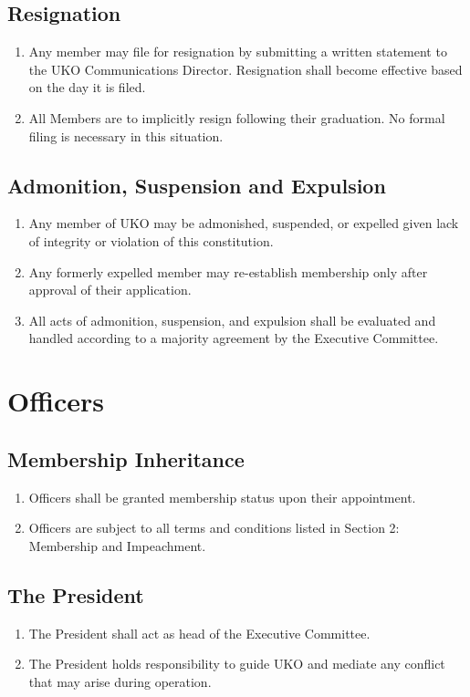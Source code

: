 \documentclass[12pt,executivepaper]{article}
\begin{document}
\subsection{Resignation}
\begin{enumerate}
    \item Any member may file for resignation by submitting a written statement
          to the UKO Communications Director. Resignation shall become
          effective based on the day it is filed.
    \item All Members are to implicitly resign following their graduation. No
          formal filing is necessary in this situation.
\end{enumerate}

\subsection{Admonition, Suspension and Expulsion}
\begin{enumerate}
    \item Any member of UKO may be admonished, suspended, or expelled given
          lack of integrity or violation of this constitution.
    \item Any formerly expelled member may re-establish membership only after
          approval of their application.
    \item All acts of admonition, suspension, and expulsion shall be evaluated
          and handled according to a majority agreement by the Executive
          Committee.
\end{enumerate}

\section{Officers}

\subsection{Membership Inheritance}
\begin{enumerate}
    \item Officers shall be granted membership status upon their appointment.
    \item Officers are subject to all terms and conditions listed in Section 2:
          Membership and Impeachment.
\end{enumerate}

\subsection{The President}
\begin{enumerate}
    \item The President shall act as head of the Executive Committee.
    \item The President holds responsibility to guide UKO and mediate any
          conflict that may arise during operation.
\end{enumerate}
\end{document}
